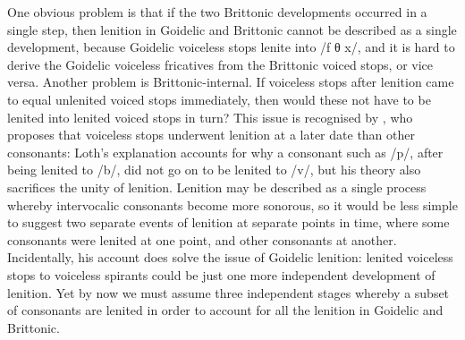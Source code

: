 One obvious problem is that if the two Brittonic developments occurred in a single step, then lenition in Goidelic and Brittonic cannot be described as a single development, because Goidelic voiceless stops lenite into /f θ x/, and it is hard to derive the Goidelic  voiceless fricatives from the Brittonic voiced stops, or vice versa. Another problem is Brittonic-internal. If voiceless stops after lenition came to equal unlenited voiced stops immediately, then would these not have to be lenited into lenited voiced stops in turn? This issue is recognised  by \textcite{loth_les_1892}, who proposes that voiceless stops underwent lenition at a later date than other consonants:
Loth's explanation accounts for why a consonant such as /p/, after being lenited to /b/, did not go on to be lenited to /v/, but his theory also sacrifices the unity of lenition. Lenition may be described as a single process whereby intervocalic consonants become more sonorous, so it would be less simple to suggest two separate events of lenition at separate points in time, where some consonants were lenited at one point, and other consonants at another. Incidentally, his account does solve the issue of Goidelic lenition:  lenited voiceless stops to voiceless spirants could be just one more independent development of lenition. Yet by now we must assume three independent stages whereby a subset of consonants are lenited in order to account for all the lenition in Goidelic and Brittonic.

